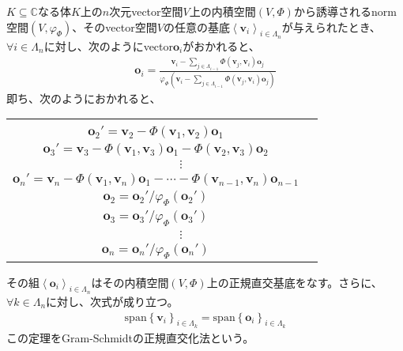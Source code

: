 \documentclass[dvipdfmx]{jsarticle}
\begin{document}
\begin{thm}\label{2.3.6.11}
$K \subseteq \mathbb{C}$なる体$K$上の$n$次元vector空間$V$上の内積空間$(V,\varPhi)$から誘導されるnorm空間$\left( V,\varphi_{\varPhi} \right)$、そのvector空間$V$の任意の基底$\left\langle \mathbf{v}_{i} \right\rangle_{i \in \varLambda_{n}}$が与えられたとき、$\forall i \in \varLambda_{n}$に対し、次のようにvector$\mathbf{o}_{i}$がおかれると、
\begin{align*}
\mathbf{o}_{i} = \frac{\mathbf{v}_{i} - \sum_{j \in \varLambda_{i - 1}} {\varPhi\left( \mathbf{v}_{j},\mathbf{v}_{i} \right)\mathbf{o}_{j}}}{\varphi_{\varPhi}\left( \mathbf{v}_{i} - \sum_{j \in \varLambda_{i - 1}} {\varPhi\left( \mathbf{v}_{j},\mathbf{v}_{i} \right)\mathbf{o}_{j}} \right)}
\end{align*}
即ち、次のようにおかれると、
\begin{longtable}[c]{cc}
\begin{tabular}{l}
$\mathbf{o}_{1}' = \mathbf{v}_{1}$\\
$\mathbf{o}_{2}' = \mathbf{v}_{2} - \varPhi\left( \mathbf{v}_{1},\mathbf{v}_{2} \right)\mathbf{o}_{1}$\\
$\mathbf{o}_{3}' = \mathbf{v}_{3} - \varPhi\left( \mathbf{v}_{1},\mathbf{v}_{3} \right)\mathbf{o}_{1} - \varPhi\left( \mathbf{v}_{2},\mathbf{v}_{3} \right)\mathbf{o}_{2}$\\
$\qquad \qquad \vdots $\\
$\mathbf{o}_{n}' = \mathbf{v}_{n} - \varPhi\left( \mathbf{v}_{1},\mathbf{v}_{n} \right)\mathbf{o}_{1} - \cdots - \varPhi\left( \mathbf{v}_{n - 1},\mathbf{v}_{n} \right)\mathbf{o}_{n - 1} $
\end{tabular} & \begin{tabular}{l}
$\mathbf{o}_{1} = {\mathbf{o}_{1}'}/{\varphi_{\varPhi}\left( \mathbf{o}_{1}' \right)}$\\
$\mathbf{o}_{2} = {\mathbf{o}_{2}'}/{\varphi_{\varPhi}\left( \mathbf{o}_{2}' \right)}$\\
$\mathbf{o}_{3} = {\mathbf{o}_{3}'}/{\varphi_{\varPhi}\left( \mathbf{o}_{3}' \right)}$\\
$\qquad \qquad \vdots $\\
$\mathbf{o}_{n} = {\mathbf{o}_{n}'}/{\varphi_{\varPhi}\left( \mathbf{o}_{n}' \right)}$
\end{tabular} \\
\end{longtable}
その組$\left\langle \mathbf{o}_{i} \right\rangle_{i \in \varLambda_{n}}$はその内積空間$(V,\varPhi)$上の正規直交基底をなす。さらに、$\forall k \in \varLambda_{n}$に対し、次式が成り立つ。
\begin{align*}
\mathrm{span}\left\{ \mathbf{v}_{i} \right\}_{i \in \varLambda_{k}} = \mathrm{span}\left\{ \mathbf{o}_{i} \right\}_{i \in \varLambda_{k}}
\end{align*}
この定理をGram-Schmidtの正規直交化法という。
\end{thm}\par
\end{document}
